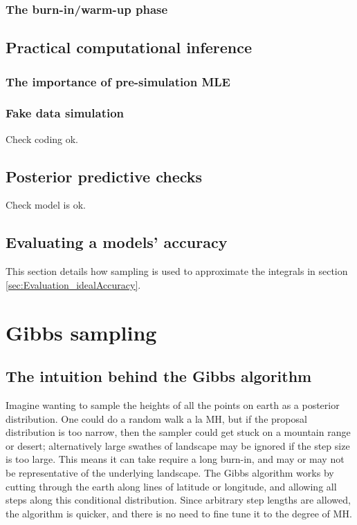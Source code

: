 \documentclass[11pt,fullpage]{book}
\begin{document}
\subsection{The burn-in/warm-up phase}

\section{Practical computational inference}
\subsection{The importance of pre-simulation MLE}
\subsection{Fake data simulation}
Check coding ok.

\section{Posterior predictive checks}
Check model is ok.

\section{Evaluating a models' accuracy}\label{sec:MCMC_evaluationAccuracy}
This section details how sampling is used to approximate the integrals in section \ref{sec:Evaluation_idealAccuracy}.

\chapter{Gibbs sampling}
\section{The intuition behind the Gibbs algorithm}
Imagine wanting to sample the heights of all the points on earth as a posterior distribution. One could do a random walk a la MH, but if the proposal distribution is too narrow, then the sampler could get stuck on a mountain range or desert; alternatively large swathes of landscape may be ignored if the step size is too large. This means it can take require a long burn-in, and may or may not be representative of the underlying landscape. The Gibbs algorithm works by cutting through the earth along lines of latitude or longitude, and allowing all steps along this conditional distribution. Since arbitrary step lengths are allowed, the algorithm is quicker, and there is no need to fine tune it to the degree of MH.
\end{document}
